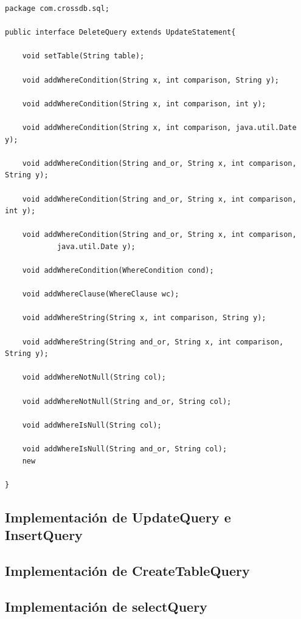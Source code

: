 \begin{lstlisting}[title=código interfaz QueryStatement]
package com.crossdb.sql;

public interface DeleteQuery extends UpdateStatement{

	void setTable(String table);

	void addWhereCondition(String x, int comparison, String y);

	void addWhereCondition(String x, int comparison, int y);

	void addWhereCondition(String x, int comparison, java.util.Date y);

	void addWhereCondition(String and_or, String x, int comparison, String y);

	void addWhereCondition(String and_or, String x, int comparison, int y);

	void addWhereCondition(String and_or, String x, int comparison,
			java.util.Date y);

	void addWhereCondition(WhereCondition cond);

	void addWhereClause(WhereClause wc);

	void addWhereString(String x, int comparison, String y);

	void addWhereString(String and_or, String x, int comparison, String y);

	void addWhereNotNull(String col);

	void addWhereNotNull(String and_or, String col);

	void addWhereIsNull(String col);

	void addWhereIsNull(String and_or, String col);
	new

}
\end{lstlisting}



\subsection{Implementación de UpdateQuery e InsertQuery}




\subsection{Implementación de CreateTableQuery}




\subsection{Implementación de selectQuery}

